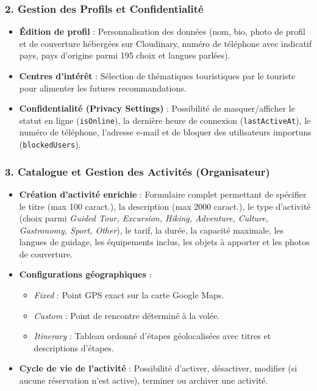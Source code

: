 \documentclass[12pt,a4paper]{report}
\begin{document}
\subsubsection{2. Gestion des Profils et Confidentialité}
\begin{itemize}[label=\textbullet]
    \item \textbf{Édition de profil} : Personnalisation des données (nom, bio, photo de profil et de couverture hébergées sur Cloudinary, numéro de téléphone avec indicatif pays, pays d'origine parmi 195 choix et langues parlées).
    \item \textbf{Centres d'intérêt} : Sélection de thématiques touristiques par le touriste pour alimenter les futures recommandations.
    \item \textbf{Confidentialité (Privacy Settings)} : Possibilité de masquer/afficher le statut en ligne (\texttt{isOnline}), la dernière heure de connexion (\texttt{lastActiveAt}), le numéro de téléphone, l'adresse e-mail et de bloquer des utilisateurs importuns (\texttt{blockedUsers}).
\end{itemize}

\subsubsection{3. Catalogue et Gestion des Activités (Organisateur)}
\begin{itemize}[label=\textbullet]
    \item \textbf{Création d'activité enrichie} : Formulaire complet permettant de spécifier le titre (max 100 caract.), la description (max 2000 caract.), le type d'activité (choix parmi \textit{Guided Tour, Excursion, Hiking, Adventure, Culture, Gastronomy, Sport, Other}), le tarif, la durée, la capacité maximale, les langues de guidage, les équipements inclus, les objets à apporter et les photos de couverture.
    \item \textbf{Configurations géographiques} :
    \begin{itemize}
        \item \textit{Fixed} : Point GPS exact sur la carte Google Maps.
        \item \textit{Custom} : Point de rencontre déterminé à la volée.
        \item \textit{Itinerary} : Tableau ordonné d'étapes géolocalisées avec titres et descriptions d'étapes.
    \end{itemize}
    \item \textbf{Cycle de vie de l'activité} : Possibilité d'activer, désactiver, modifier (si aucune réservation n'est active), terminer ou archiver une activité.
\end{itemize}
\end{document}
